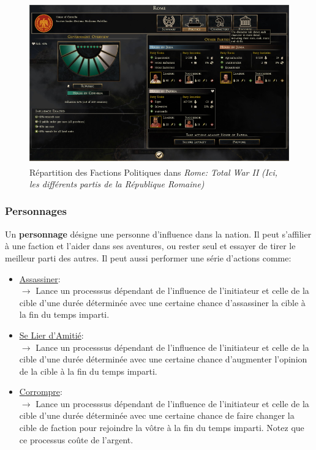 \documentclass{article}
\def\reg{\small{\textsuperscript{\textregistered}}}
\begin{document}
                \begin{figure}[h]
                    \centering
                        \includegraphics[scale=0.5]{image_rome2_factions.jpg}
                        \caption{Répartition des Factions Politiques dans \textit{Rome: Total War II\reg} \textit{(Ici, les différents partis de la République Romaine)}}
                        \label{fig:x photosysteme}
                \end{figure}
            
            \subsubsection{Personnages}
                Un \textbf{personnage} désigne une personne d'influence dans la nation. Il peut s'affilier à une faction et l'aider dans ses aventures, ou rester seul et essayer de tirer le meilleur parti des autres. Il peut aussi performer une série d'actions comme:\\
                    \begin{itemize}
                        \item \underline{Assassiner}:\\
                            $\rightarrow$ Lance un processsus dépendant de l'influence de l'initiateur et celle de la cible d'une durée déterminée avec une certaine chance d'assassiner la cible à la fin du temps imparti.\\
                        \item \underline{Se Lier d'Amitié}:\\
                            $\rightarrow$ Lance un processsus dépendant de l'influence de l'initiateur et celle de la cible d'une durée déterminée avec une certaine chance d'augmenter l'opinion de la cible à la fin du temps imparti.\\
                        \item \underline{Corrompre}:\\
                            $\rightarrow$ Lance un processsus dépendant de l'influence de l'initiateur et celle de la cible d'une durée déterminée avec une certaine chance de faire changer la cible de faction pour rejoindre la vôtre à la fin du temps imparti. Notez que ce processus coûte de l'argent.\\
                    \end{itemize}
            
\end{document}
